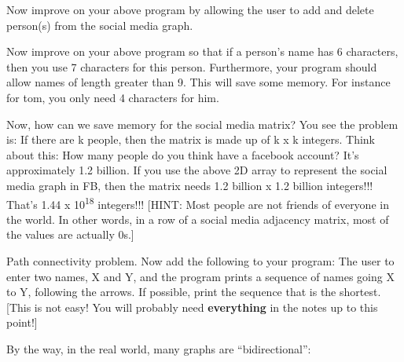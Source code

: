 \begin{ex}
Now improve on your above program by allowing the user to add
and delete person(s) from the social media graph.
\end{ex}

\begin{ex}
Now improve on your above program so that if a person's name
has 6 characters, then you use 7 characters for this person.
Furthermore, your program should allow names of length greater than 9.
This will save some memory. For instance for tom, you only need 4
characters for him.
\end{ex}

\begin{ex}
Now, how can we save memory for the social media matrix? You
see the problem is: If there are k people, then the matrix is made up of
k x k integers. Think about this: How many people do you think have a
facebook account? It's approximately 1.2 billion. If you use the above
2D array to represent the social media graph in FB, then the matrix
needs 1.2 billion x 1.2 billion integers!!! That's 1.44 x
10\textsuperscript{18} integers!!! [HINT: Most people are not friends
of everyone in the world. In other words, in a row of a social media
adjacency matrix, most of the values are actually 0s.]
\end{ex}

\begin{ex}
Path connectivity problem. Now add the following to
your program: The user to enter two names, X and Y, and the program
prints a sequence of names going X to Y, following the arrows. If
possible, print the sequence that is the shortest. [This is not easy!
You will probably need \textbf{everything} in the notes up to this
point!]
\end{ex}

By the way, in the real world, many graphs are ``bidirectional'':

